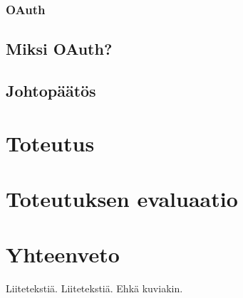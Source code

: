 \documentclass{tktltiki}
\begin{document}
\subsubsection{OAuth}

\subsection{Miksi OAuth?}
\subsection{Johtopäätös}

\section{Toteutus}
\section{Toteutuksen evaluaatio}
\section{Yhteenveto}


\lastpage
\appendices
{}
Liitetekstiä.
Liitetekstiä. Ehkä kuviakin.
\end{document}
